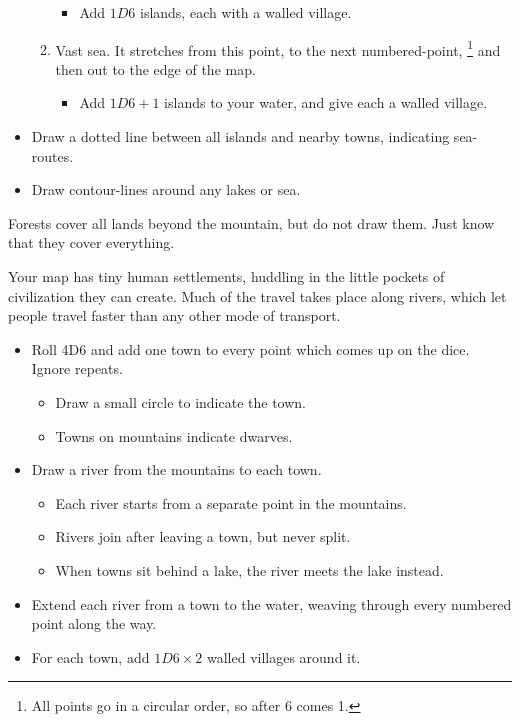 \begin{multicols}{2}
\begin{itemize}
\begin{enumerate}
    \begin{itemize}
    \item
      Add $1D6$ islands, each with a walled village.
    \end{itemize}
  \item
    Vast sea. It stretches from this point, to the next numbered-point,%
    \footnote{All points go in a circular order, so after 6 comes 1.}
    and then out to the edge of the map.
    \begin{itemize}
    \item
      Add $1D6+1$ islands to your water, and give each a walled village.
    \end{itemize}
  \end{enumerate}
\item
  Draw a dotted line between all islands and nearby towns, indicating
  sea-routes.
\item
  Draw contour-lines around any lakes or sea.
\end{itemize}

Forests cover all lands beyond the mountain, but do not draw them. Just
know that they cover everything.


Your map has tiny human settlements, huddling in the little pockets of civilization they can create.
Much of the travel takes place along rivers, which let people travel faster than any other mode of transport.

\begin{itemize}
\item
  Roll 4D6 and add one town to every point which comes up on the dice.
  Ignore repeats.

  \begin{itemize}
  \item
    Draw a small circle to indicate the town.
  \item
    Towns on mountains indicate dwarves.
  \end{itemize}
\item
  Draw a river from the mountains to each town.

  \begin{itemize}
  \item
    Each river starts from a separate point in the mountains.
  \item
    Rivers join after leaving a town, but never split.
  \item
    When towns sit behind a lake, the river meets the lake instead.
  \end{itemize}
\item
  Extend each river from a town to the water, weaving through every
  numbered point along the way.
\item
  For each town, add $1D6 \times 2$ walled villages around it.


\end{itemize}
\end{multicols}
